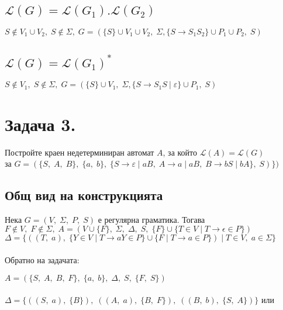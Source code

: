 \documentclass[12pt]{article}
\newcommand{\Lang}{\mathcal{L}}
\begin{document}
\subsection{$\Lang(G) = \Lang(G_1).\Lang(G_2)$}

$S \notin V_1 \cup V_2, \; S \notin \Sigma, \; G = (\{S\} \cup V_1 \cup V_2, \; \Sigma, \{S \to S_1S_2\} \cup P_1 \cup P_2, \; S)$

\subsection{$\Lang(G) = \Lang(G_1)^*$}

$S \notin V_1, \; S \notin \Sigma, \; G = (\{S\} \cup V_1, \; \Sigma, \{S \to S_1S \: | \; \varepsilon\} \cup P_1, \; S)$

\section{Задача 3.}

Постройте краен недетерминиран автомат $A$, за който $\Lang(A) = \Lang(G)$ \\

за $G = (\{S, \; A, \; B\}, \; \{a, \; b\}, \; \{S \to \varepsilon \; | \; aB, \; A \to a \; | \; aB, \; B \to bS \; | \; bA\}, \; S) \})$ \\

\subsection{Общ вид на конструкцията}

Нека $G = (V, \; \Sigma, \; P, \; S)$ е регулярна граматика. Тогава \\

$F \notin V, \; F \notin \Sigma,  \; A = (V \cup \{F\}, \; \Sigma, \; \Delta, \; S, \; \{F\} \cup \{T \in V \; | \; T \to \epsilon \in P \})$ \\

$\Delta = \{((T, \; a), \; \{Y \in V \; | \; T \to aY \in P\} \cup \{F \; | \; T \to a \in P\}) \; | \; T \in V, \; a \in \Sigma\}$ \\\\

Обратно на задачата:

$A = (\{S, \; A, \; B, \; F\}, \; \{a, \; b\}, \; \Delta, \; S, \; \{F, \; S\})$ \\\\

$\Delta = \{((S, \; a), \; \{B\}), \; ((A, \; a), \; \{B, \; F\}), \; ((B, \; b), \; \{S, \; A\})\}$ или \\\\
\end{document}
